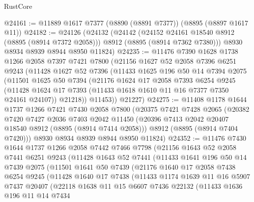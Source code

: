 \begin{lexlean}{RustCore}
\begin{coremodule}
@24161 := @11889 @1617 @7377 (@8890 (@8891 @7377)) (@8895 (@8897 @1617 @11))
@24182 := @24126
    (@24132
      (@24142
        (@24152 @24161 @18540 @8912 (@8895 (@8914 @7372 @2058)))
        @8912
        (@8895 (@8914 @7362 @7380)))
      @8930
      @8934
      @8939
      @8944
      @8950
      @11824)
@24235 := @11476
    @7390
    @1628
    @1738
    @1266
    @2058
    @7397
    @7421
    @7800
    (@21156
      @1627
      @52
      @2058
      @7396
      @6251
      @9243
      (@11428
        @1627
        @52
        @7396
        (@11433
          @1625
          @196
          @50
          @14
          @7394
          @2075
          (@11501
            @1625
            @50
            @7394
            (@21176
              @1624
              @17
              @2058
              @7393
              @6254
              @9245
              (@11428 @1624 @17 @7393 (@11433 @1618 @1610 @11 @16 @7377 @7350 @24161 @24107))
              @21218))
          @11453))
      @21227)
@24275 := @11408
    @1178
    @1644
    @1737
    @1266
    @7421
    @7430
    @2058
    @7800
    (@20375
      @7421
      @7428
      @2065
      (@20382
        @7420
        @7427
        @2036
        @7403
        @2042
        @11450
        (@20396 @7413 @2042 @20407 @18540 @8912 (@8895 (@8914 @7414 @2058)))
        @8912
        (@8895 (@8914 @7404 @7420)))
      @8930
      @8934
      @8939
      @8944
      @8950
      @11824)
@24352 := @11476
    @7430
    @1644
    @1737
    @1266
    @2058
    @7442
    @7466
    @7798
    (@21156
      @1643
      @52
      @2058
      @7441
      @6251
      @9243
      (@11428
        @1643
        @52
        @7441
        (@11433
          @1641
          @196
          @50
          @14
          @7439
          @2075
          (@11501
            @1641
            @50
            @7439
            (@21176
              @1640
              @17
              @2058
              @7438
              @6254
              @9245
              (@11428
                @1640
                @17
                @7438
                (@11433
                  @1174
                  @1639
                  @11
                  @16
                  @5907
                  @7437
                  @20407
                  (@22118
                    @1638
                    @11
                    @15
                    @6607
                    @7436
                    @22132
                    (@11433
                      @1636
                      @196
                      @11
                      @14
                      @7434

\end{coremodule}
\end{lexlean}
